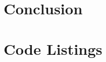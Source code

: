 \documentclass[12pt, openany, a4paper]{book}
\begin{document}
% 

\chapter{Conclusion}


\appendix


\newpage
{}
\mbox{}
\newpage




\chapter{Code Listings}

%



 
\clearpage
\printglossary

\cleardoublepage


\end{document}
